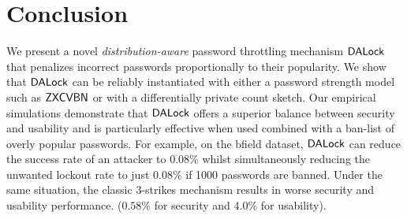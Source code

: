 

\section{Conclusion}
We present a novel {\em distribution-aware} password throttling mechanism $\mathsf{DALock}$ that penalizes incorrect passwords proportionally to their popularity. We show that $\mathsf{DALock}$ can be reliably instantiated with either a password strength model such as $\mathsf{ZXCVBN}$ or with a differentially private count sketch. Our empirical simulations demonstrate that $\mathsf{DALock}$ offers a superior balance between security and usability and is particularly effective when used combined with a ban-list of overly popular passwords. For example, on the bfield dataset, $\mathsf{DALock}$ can reduce the success rate of an attacker to $0.08\%$ whilst simultaneously reducing the unwanted lockout rate to just $0.08\%$ if 1000 passwords are banned. Under the same situation, the classic 3-strikes mechanism results in worse security and usability performance. ($0.58\%$ for security and 4.0\% for usability).

